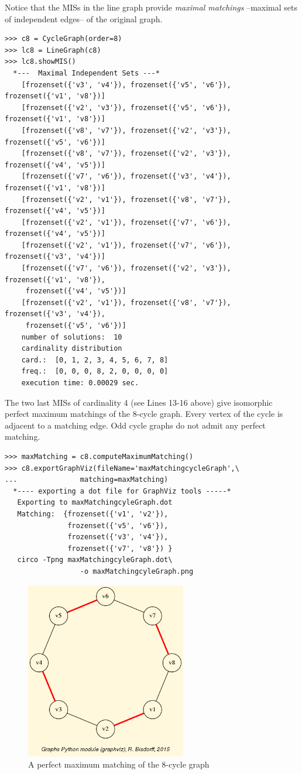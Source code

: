Notice that the MISs in the line graph provide \emph{maximal matchings} --maximal sets of independent edges-- of the original graph.
\begin{lstlisting}[basicstyle=\scriptsize]
>>> c8 = CycleGraph(order=8)
>>> lc8 = LineGraph(c8)
>>> lc8.showMIS()
  *---  Maximal Independent Sets ---*
    [frozenset({'v3', 'v4'}), frozenset({'v5', 'v6'}), frozenset({'v1', 'v8'})]
    [frozenset({'v2', 'v3'}), frozenset({'v5', 'v6'}), frozenset({'v1', 'v8'})]
    [frozenset({'v8', 'v7'}), frozenset({'v2', 'v3'}), frozenset({'v5', 'v6'})]
    [frozenset({'v8', 'v7'}), frozenset({'v2', 'v3'}), frozenset({'v4', 'v5'})]
    [frozenset({'v7', 'v6'}), frozenset({'v3', 'v4'}), frozenset({'v1', 'v8'})]
    [frozenset({'v2', 'v1'}), frozenset({'v8', 'v7'}), frozenset({'v4', 'v5'})]
    [frozenset({'v2', 'v1'}), frozenset({'v7', 'v6'}), frozenset({'v4', 'v5'})]
    [frozenset({'v2', 'v1'}), frozenset({'v7', 'v6'}), frozenset({'v3', 'v4'})]
    [frozenset({'v7', 'v6'}), frozenset({'v2', 'v3'}), frozenset({'v1', 'v8'}),
     frozenset({'v4', 'v5'})]
    [frozenset({'v2', 'v1'}), frozenset({'v8', 'v7'}), frozenset({'v3', 'v4'}),
     frozenset({'v5', 'v6'})]
    number of solutions:  10
    cardinality distribution
    card.:  [0, 1, 2, 3, 4, 5, 6, 7, 8]
    freq.:  [0, 0, 0, 8, 2, 0, 0, 0, 0]
    execution time: 0.00029 sec.
\end{lstlisting}
The two last MISs of cardinality 4 (see Lines 13-16 above) give isomorphic perfect maximum matchings of the 8-cycle graph. Every vertex of the cycle is adjacent to a matching edge. Odd cycle graphs do not admit any perfect matching.
\begin{lstlisting}
>>> maxMatching = c8.computeMaximumMatching()
>>> c8.exportGraphViz(fileName='maxMatchingcycleGraph',\
...   		      matching=maxMatching)
  *---- exporting a dot file for GraphViz tools -----*
   Exporting to maxMatchingcyleGraph.dot
   Matching:  {frozenset({'v1', 'v2'}),
               frozenset({'v5', 'v6'}),
               frozenset({'v3', 'v4'}),
               frozenset({'v7', 'v8'}) }
   circo -Tpng maxMatchingcyleGraph.dot\
                  -o maxMatchingcyleGraph.png
\end{lstlisting}
\begin{figure}[h]
\sidecaption
\includegraphics[width=7cm]{Figures/maxMatchingcycleGraph.png}
\caption{A perfect maximum matching of the 8-cycle graph} 
\label{fig:21.4}       %
\end{figure}
	    
